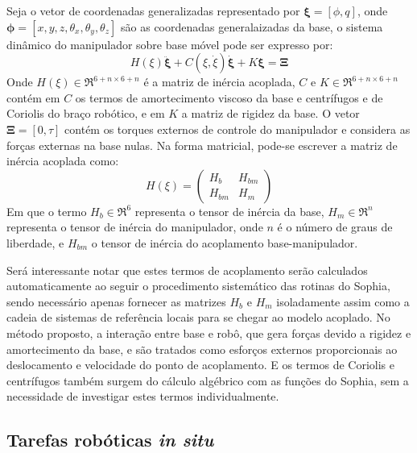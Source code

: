 Seja o vetor de coordenadas generalizadas representado por $\boldsymbol{\xi} =
[\phi, q]$, onde $\boldsymbol{\phi} = [x, y, z, \theta_x, \theta_y, \theta_z]$
são as coordenadas generalaizadas da base, o sistema dinâmico do manipulador sobre base móvel pode
ser expresso por:
%
\begin{equation}
	H(\xi) \ddot{\boldsymbol{\xi}} + C(\xi , \dot{\xi}) \dot{\boldsymbol{\xi}} + K
	\boldsymbol{\xi} = \boldsymbol{\Xi}
\end{equation}
%
Onde $H(\xi) \in \Re^{6+n \times 6+n}$ é a matriz de inércia acoplada, $C$ e $K
\in \Re^{6+n \times 6+n}$ contém em $C$ os termos de amortecimento viscoso da
base e centrífugos e de Coriolis do braço robótico, e em $K$ a matriz de rigidez
da base.
O vetor $\boldsymbol{\Xi} = [0, \tau]$ contém os torques externos de controle do
manipulador e considera as forças externas na base nulas. Na forma matricial,
pode-se escrever a matriz de inércia acoplada como:
%
\begin{equation}
	H(\xi) = \begin{pmatrix}
			H_b 	&	H_{bm} \\ 
			H_{bm}	&	H_m
\end{pmatrix}
\end{equation}
%
Em que o termo $H_b \in \Re^{6}$ representa o tensor de inércia da base, $H_m
\in \Re^{n}$ representa o tensor de inércia do manipulador, onde $n$ é o número
de graus de liberdade, e $H_{bm}$ o tensor de inércia do acoplamento
base-manipulador.

Será interessante notar que estes termos de acoplamento serão calculados
automaticamente ao seguir o procedimento sistemático das rotinas do Sophia,
sendo necessário apenas fornecer as matrizes $H_b$ e $H_m$ isoladamente assim
como a cadeia de sistemas de referência locais para se chegar ao modelo
acoplado. No método proposto, a interação entre base e robô, que gera forças devido a
rigidez e amortecimento da base, e são tratados como esforços externos
proporcionais ao deslocamento e velocidade do ponto de acoplamento. E os termos
de Coriolis e centrífugos também surgem do cálculo algébrico com as
funções do Sophia, sem a necessidade de investigar estes termos individualmente. 



\subsection{Tarefas robóticas \textit{in situ}} \label{sec::insitu}


